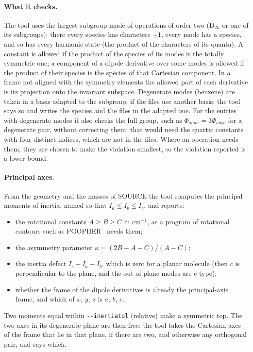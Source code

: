 \paragraph{What it checks.} The tool uses the largest subgroup made of
operations of order two (D$_{2h}$ or one of its subgroups): there every
species has characters $\pm1$, every mode has a species, and so has
every harmonic state (the product of the characters of its quanta). A
constant is allowed if the product of the species of its modes is the
totally symmetric one; a component of a dipole derivative over some
modes is allowed if the product of their species is the species of that
Cartesian component. In a frame not aligned with the symmetry elements
the allowed part of each derivative is its projection onto the
invariant subspace. Degenerate modes (benzene) are taken in a basis
adapted to the subgroup; if the files use another basis, the tool says
so and writes the species and the files in the adapted one. For the
entries with degenerate modes it also checks the full group, such as
$\Phi_{aaaa}=3\Phi_{aabb}$ for a degenerate pair, without correcting
them: that would need the quartic constants with four distinct indices,
which are not in the files. Where an operation needs them, they are
chosen to make the violation smallest, so the violation reported is a
lower bound.

\paragraph{Principal axes.} From the geometry and the masses of SOURCE
the tool computes the principal moments of inertia, named so that
$I_a \le I_b \le I_c$, and reports:
\begin{itemize}
\item the rotational constants $A \ge B \ge C$ in cm$^{-1}$, as a program of
  rotational contours such as PGOPHER~\cite{pgopher} needs them;
\item the asymmetry parameter $\kappa = (2B-A-C)/(A-C)$;
\item the inertia defect $I_c - I_a - I_b$, which is zero for a planar
  molecule (then $c$ is perpendicular to the plane, and the out-of-plane
  modes are c-type);
\item whether the frame of the dipole derivatives is already the
  principal-axis frame, and which of $x$, $y$, $z$ is $a$, $b$, $c$.
\end{itemize}
Two moments equal within \texttt{-{}-inertiatol} (relative) make a
symmetric top. The two axes in its degenerate plane are then free: the
tool takes the Cartesian axes of the frame that lie in that plane, if
there are two, and otherwise any orthogonal pair, and says which.

